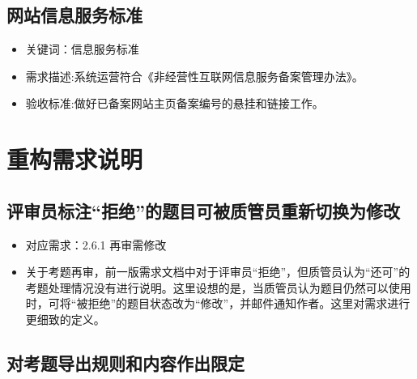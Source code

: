\documentclass[hyperref, a4paper]{ctexart}
\providecommand{\tightlist}{%
  \setlength{\itemsep}{0pt}\setlength{\parskip}{0pt}}
\begin{document}
\hypertarget{ux7f51ux7ad9ux4fe1ux606fux670dux52a1ux6807ux51c6}{%
\subsection{网站信息服务标准}\label{ux7f51ux7ad9ux4fe1ux606fux670dux52a1ux6807ux51c6}}

\begin{itemize}
\tightlist
\item
  关键词：信息服务标准
\item
  需求描述:系统运营符合《非经营性互联网信息服务备案管理办法》。
\item
  验收标准:做好已备案网站主页备案编号的悬挂和链接工作。
\end{itemize}

\hypertarget{ux91cdux6784ux9700ux6c42ux8bf4ux660e}{%
\section{重构需求说明}\label{ux91cdux6784ux9700ux6c42ux8bf4ux660e}}

\hypertarget{ux8bc4ux5ba1ux5458ux6807ux6ce8ux62d2ux7eddux7684ux9898ux76eeux53efux88abux8d28ux7ba1ux5458ux91cdux65b0ux5207ux6362ux4e3aux4feeux6539}{%
\subsection{评审员标注``拒绝''的题目可被质管员重新切换为修改}\label{ux8bc4ux5ba1ux5458ux6807ux6ce8ux62d2ux7eddux7684ux9898ux76eeux53efux88abux8d28ux7ba1ux5458ux91cdux65b0ux5207ux6362ux4e3aux4feeux6539}}

\begin{itemize}
\tightlist
\item
  对应需求：2.6.1 再审需修改
\item
  关于考题再审，前一版需求文档中对于评审员``拒绝''，但质管员认为``还可''的考题处理情况没有进行说明。这里设想的是，当质管员认为题目仍然可以使用时，可将``被拒绝''的题目状态改为``修改''，并邮件通知作者。这里对需求进行更细致的定义。
\end{itemize}

\hypertarget{ux5bf9ux8003ux9898ux5bfcux51faux89c4ux5219ux548cux5185ux5bb9ux4f5cux51faux9650ux5b9a}{%
\subsection{对考题导出规则和内容作出限定}\label{ux5bf9ux8003ux9898ux5bfcux51faux89c4ux5219ux548cux5185ux5bb9ux4f5cux51faux9650ux5b9a}}
\end{document}
